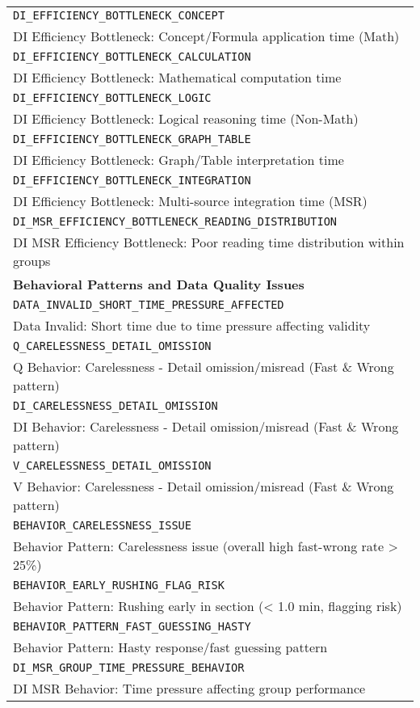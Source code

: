 \documentclass{article}
\begin{document}
{\begin{longtable}{|p{}|}
\hline
\texttt{DI\_EFFICIENCY\_BOTTLENECK\_CONCEPT} \\
DI Efficiency Bottleneck: Concept/Formula application time (Math) \\
\hline
\texttt{DI\_EFFICIENCY\_BOTTLENECK\_CALCULATION} \\
DI Efficiency Bottleneck: Mathematical computation time \\
\hline
\texttt{DI\_EFFICIENCY\_BOTTLENECK\_LOGIC} \\
DI Efficiency Bottleneck: Logical reasoning time (Non-Math) \\
\hline
\texttt{DI\_EFFICIENCY\_BOTTLENECK\_GRAPH\_TABLE} \\
DI Efficiency Bottleneck: Graph/Table interpretation time \\
\hline
\texttt{DI\_EFFICIENCY\_BOTTLENECK\_INTEGRATION} \\
DI Efficiency Bottleneck: Multi-source integration time (MSR) \\
\hline
\texttt{DI\_MSR\_EFFICIENCY\_BOTTLENECK\_READING\_DISTRIBUTION} \\
DI MSR Efficiency Bottleneck: Poor reading time distribution within groups \\
\hline
\textbf{Behavioral Patterns and Data Quality Issues} \\
\hline
\texttt{DATA\_INVALID\_SHORT\_TIME\_PRESSURE\_AFFECTED} \\
Data Invalid: Short time due to time pressure affecting validity \\
\hline
\texttt{Q\_CARELESSNESS\_DETAIL\_OMISSION} \\
Q Behavior: Carelessness - Detail omission/misread (Fast \& Wrong pattern) \\
\hline
\texttt{DI\_CARELESSNESS\_DETAIL\_OMISSION} \\
DI Behavior: Carelessness - Detail omission/misread (Fast \& Wrong pattern) \\
\hline
\texttt{V\_CARELESSNESS\_DETAIL\_OMISSION} \\
V Behavior: Carelessness - Detail omission/misread (Fast \& Wrong pattern) \\
\hline
\texttt{BEHAVIOR\_CARELESSNESS\_ISSUE} \\
Behavior Pattern: Carelessness issue (overall high fast-wrong rate > 25\%) \\
\hline
\texttt{BEHAVIOR\_EARLY\_RUSHING\_FLAG\_RISK} \\
Behavior Pattern: Rushing early in section (< 1.0 min, flagging risk) \\
\hline
\texttt{BEHAVIOR\_PATTERN\_FAST\_GUESSING\_HASTY} \\
Behavior Pattern: Hasty response/fast guessing pattern \\
\hline
\texttt{DI\_MSR\_GROUP\_TIME\_PRESSURE\_BEHAVIOR} \\
DI MSR Behavior: Time pressure affecting group performance \\

\end{longtable} %

} %
\end{document}
